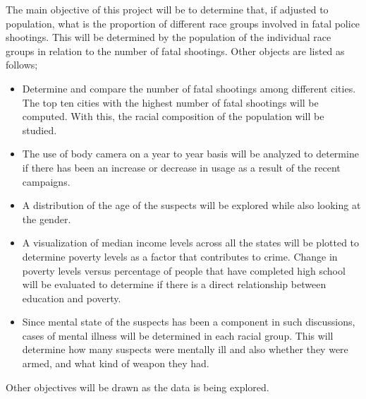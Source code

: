 \documentclass[a4paper,12pt]{article}
\begin{document}
The main objective of this project will be to determine that, if adjusted to population, what is the proportion of different race groups involved in fatal police shootings. This will be determined by the population of the individual race groups in relation to the number of fatal shootings. Other objects are listed as follows;

\begin{itemize}
  \item Determine and compare the number of fatal shootings among different cities. The top ten cities with the highest number of fatal shootings will be computed. With this, the racial composition of the population will be studied.
  \item The use of body camera on a year to year basis will be analyzed to determine if there has been an increase or decrease in usage as a result of the recent campaigns.
  \item A distribution of the age of the suspects will be explored while also looking at the gender.
  \item A visualization of median income levels across all the states will be plotted to determine poverty levels as a factor that contributes to crime. Change in poverty levels versus percentage of people that have completed high school will be evaluated to determine if there is a direct relationship between education and poverty.
  \item Since mental state of the suspects has been a component in such discussions, cases of mental illness will be determined in each racial group. This will determine how many suspects were mentally ill and also whether they were armed, and what kind of weapon they had.
\end{itemize}
Other objectives will be drawn as the data is being explored.



\end{document}

